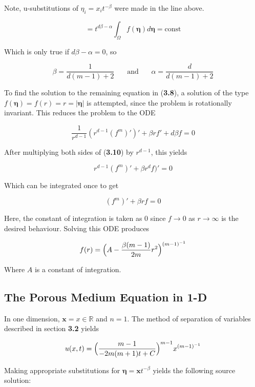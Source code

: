 \documentclass[paper=a4, fontsize=12pt]{scrartcl} %
\numberwithin{equation}{section} %
\numberwithin{table}{section} %
\begin{document}
Note, u-substitutions of $\eta_i = x_i t^{-\beta}$ were made in the line above.

$$=t^{d\beta - \alpha} \int_\Omega f(\mathbf{\eta}) d \mathbf{\eta} = \text{const}$$

Which is only true if $d \beta - \alpha = 0$, so 

\begin{equation}
    \beta = \frac{1}{d(m-1) + 2} ~~~~~~~~ \text{and} ~~~~~~~~ \alpha = \frac{d}{d(m-1) + 2}
\end{equation}


To find the solution to the remaining equation in (\textbf{3.8}), a solution of the type $f(\mathbf{\eta}) = f(r) = r = | \mathbf{\eta}|$ is attempted, since the problem is rotationally invariant. This reduces the problem to the ODE

\begin{equation}
    \frac{1}{r^{d-1}}(r^{d-1}(f^m)')' + \beta r f' + d \beta f = 0
\end{equation}

After multiplying both sides of (\textbf{3.10}) by $r^{d-1}$, this yields 

$$r^{d-1} (f^m)' + \beta r^d f)'=0$$

Which can be integrated once to get

$$(f^m)' + \beta r f = 0$$

Here, the constant of integration is taken as $0$ since $f \to 0$ as $r \to \infty$ is the desired behaviour. Solving this ODE produces

\begin{equation}
    f(r) = \Big{(}A - \frac{\beta(m-1)}{2m}r^2 \Big{)}^{(m-1)^{-1}}
\end{equation}

Where $A$ is a constant of integration.

\subsection{The Porous Medium Equation in 1-D}

In one dimension, $\mathbf{x}= x \in \mathbb{R}$ and $n=1$. The method of separation of variables described in section \textbf{3.2} yields 

\begin{equation}
    u(x,t) = \Big{(} \frac{m-1}{-2m(m+1)t + C}\Big{)}^{m-1} x^{(m-1)^{-1}}
\end{equation}

Making appropriate substitutions for $\mathbf{\eta} = \mathbf{x}t^{-\beta}$ yields the following source solution:
\end{document}
